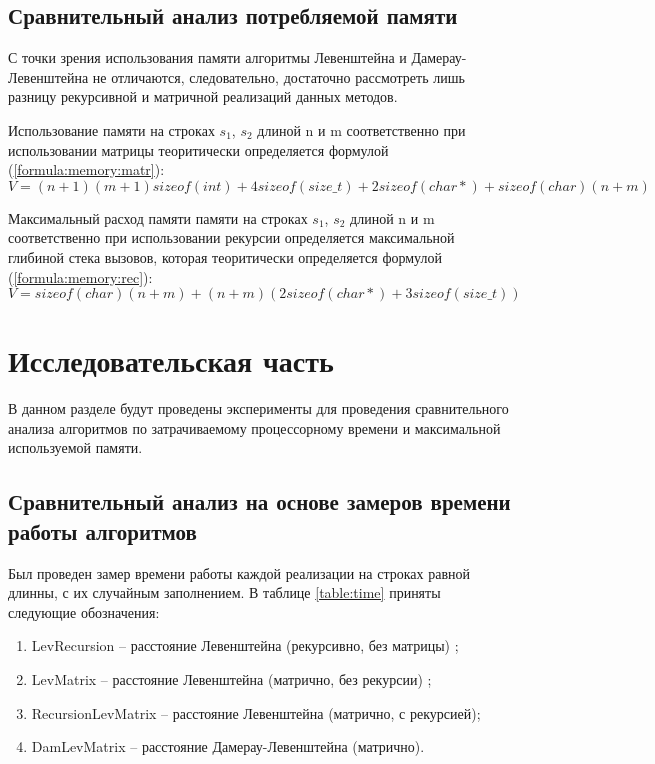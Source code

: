 \documentclass[utf8x, 12pt]{G7-32}
\begin{document}
    \section{Сравнительный анализ потребляемой памяти}  
        С точки зрения использования памяти алгоритмы Левенштейна и
        Дамерау-Левенштейна не отличаются, следовательно, достаточно
        рассмотреть лишь разницу рекурсивной и матричной реализаций
        данных методов.
        
        Использование памяти на строках $s_1$, $s_2$ длиной n и m соответственно
        при использовании матрицы теоритически определяется формулой (\ref{formula:memory:matr}):
        \begin{equation}
            V = (n + 1)(m + 1)sizeof(int) + 4sizeof(size\_t) + 2sizeof(char*) + sizeof(char)(n + m)
            \label{formula:memory:matr}
        \end{equation}
        

        Максимальный расход памяти памяти на строках $s_1$, $s_2$ длиной n и m соответственно
        при использовании рекурсии определяется максимальной глибиной стека вызовов,
        которая теоритически определяется формулой (\ref{formula:memory:rec}):
        \begin{equation}
            V = sizeof(char)(n + m)  + (n + m)(2sizeof(char*) + 3sizeof(size\_t))
            \label{formula:memory:rec}
        \end{equation}




\chapter{Исследовательская часть}
    В данном разделе будут проведены эксперименты для проведения 
    сравнительного анализа алгоритмов по затрачиваемому процессорному 
    времени\cite{link2} и максимальной используемой памяти.

\section{Сравнительный анализ на основе замеров времени работы алгоритмов}

Был проведен замер времени работы каждой реализации на строках равной длинны, с их случайным заполнением.
В таблице \ref{table:time} приняты следующие обозначения:\begin{enumerate}
            \item LevRecursion -- расстояние Левенштейна (рекурсивно, без матрицы) ;
            \item LevMatrix -- расстояние Левенштейна (матрично, без рекурсии) ;
            \item RecursionLevMatrix -- расстояние Левенштейна (матрично, с рекурсией);
	    \item DamLevMatrix -- расстояние Дамерау-Левенштейна (матрично).
        \end{enumerate}
\end{document}
